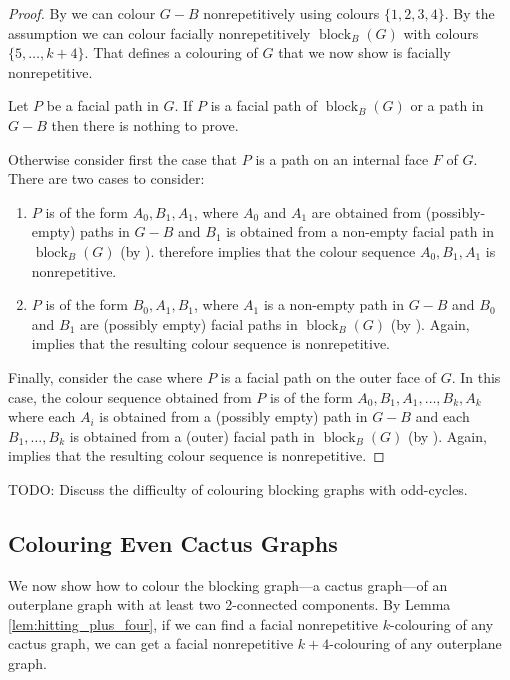 \documentclass{patmorin}
\DeclareMathOperator{\block}{block}
\begin{document}
\begin{proof}
By  we can colour $G-B$ nonrepetitively using colours
$\{1,2,3,4\}$. By the assumption we can colour  facially
nonrepetitively $\block_{B}(G)$ with colours $\{5,\dots, k+4\}$. That
defines a colouring of $G$ that we now show is facially
nonrepetitive. 

Let $P$ be a facial path in $G$. If $P$ is a facial path of
$\block_{B}(G)$ or a path in $G-B$ then there is nothing to prove.

Otherwise consider first the case that $P$ is a path on an internal
face $F$ of $G$.   There are two cases to consider:
\begin{enumerate}
\item $P$ is of the form $A_0,B_1,A_1$, where $A_0$ and $A_1$ are obtained
from (possibly-empty) paths in $G-B$ and $B_1$ is obtained from a
non-empty facial path in $\block_B(G)$ (by ).   therefore
implies that the colour sequence $A_0,B_1,A_1$ is nonrepetitive.

\item $P$ is of the form $B_0,A_1,B_1$, where $A_1$ is a non-empty path
  in $G-B$ and $B_0$ and $B_1$ are (possibly empty) facial paths in
  $\block_B(G)$ (by ).
Again,  implies that the resulting colour sequence
is nonrepetitive.
\end{enumerate}

Finally, consider the case where $P$ is a facial path on the outer
face of $G$.  In this case, the colour sequence obtained from $P$ is
of the form $A_0,B_1,A_1,\ldots,B_k,A_k$ where each $A_i$ is obtained
from a (possibly empty) path in $G-B$ and each $B_1,\ldots,B_k$ is
obtained from a (outer) facial path in $\block_B(G)$ (by ). 
Again,  implies that the resulting colour sequence
is nonrepetitive.
\end{proof}

TODO: Discuss the difficulty of colouring blocking graphs with odd-cycles.

\subsection{Colouring Even Cactus Graphs}

We now show how to colour the blocking graph---a cactus graph---of an outerplane graph with at least two 2-connected components.
By Lemma \ref{lem:hitting_plus_four}, if we can find a facial nonrepetitive $k$-colouring of any cactus graph, we can get a facial nonrepetitive $k+4$-colouring of any outerplane graph. 
\end{document}
